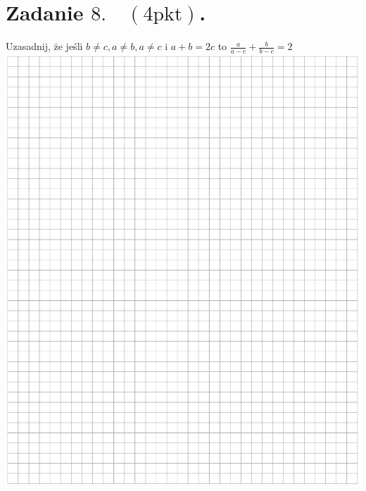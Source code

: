 \documentclass[10pt]{article}
\begin{document}
\section*{Zadanie \(8 . \quad(4 \mathrm{pkt})\).}
Uzasadnij, że jeśli \(b \neq c, a \neq b, a \neq c\) i \(a+b=2 c\) to \(\frac{a}{a-c}+\frac{b}{b-c}=2\)\\
\includegraphics[max width=\textwidth, center]{2024_11_21_439e1d90cd1e7f928ae2g-06}
\end{document}

